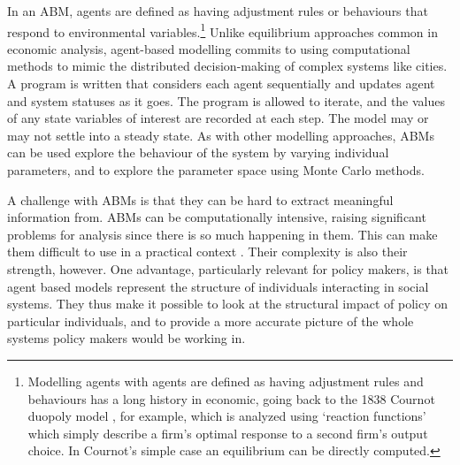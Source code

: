 In an \gls{ABM}, agents are defined as having adjustment rules or behaviours that respond to environmental variables.\footnote{Modelling agents with agents are defined as having adjustment rules and behaviours has a long history in economic, going back to the 1838 Cournot duopoly model \cite{cournotRecherchesPrincipesMathematiques1968a}, for example, which is analyzed using `reaction functions' which simply describe a firm's optimal response to a second firm's output choice. In Cournot's simple case an equilibrium can be directly computed.}  
Unlike equilibrium approaches common in economic analysis, agent-based modelling commits to using computational methods to mimic the distributed decision-making of complex systems like cities. A program is written that considers each agent sequentially and updates agent and system statuses as it goes. The program is allowed to iterate, and the values of any state variables of interest are recorded at each step. The model may or may not settle into a steady state. As with other modelling approaches, ABMs can be used explore the behaviour of the system by varying individual parameters, and to explore the parameter space using Monte Carlo methods.

A challenge with ABMs is that they can be hard to extract meaningful information from. ABMs can be computationally intensive, raising significant problems for analysis since there is so much happening in them. This can make them difficult to use in a practical context \cite{ABM_challegnes_REF}. %
% 
Their complexity is also their strength, however. %
One advantage, particularly relevant for policy makers, is that agent based models represent the structure of individuals interacting in social systems. %
They thus make it possible to look at the structural impact of policy on particular individuals, and to provide a more accurate picture of the whole systems policy makers would be working in.



